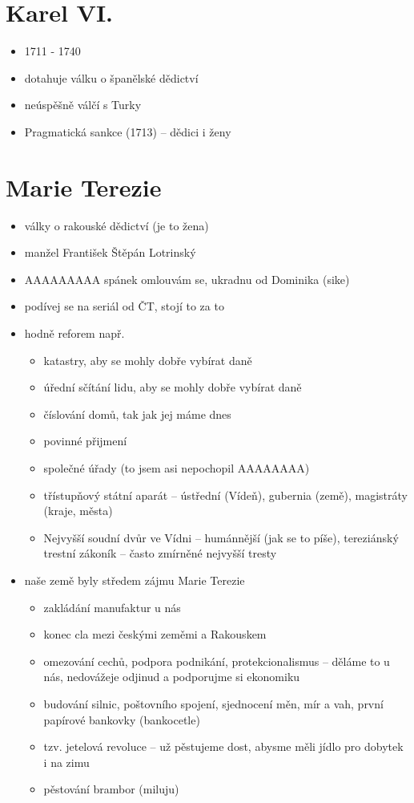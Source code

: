 \documentclass{article}
\begin{document}
\section{Karel VI.}
\begin{itemize}
  \item 1711 - 1740
  \item dotahuje válku o španělské dědictví
  \item neúspěšně válčí s Turky
  \item Pragmatická sankce (1713) -- dědici i ženy
\end{itemize}

\section{Marie Terezie}
\begin{itemize}
  \item války o rakouské dědictví (je to žena)
  \item manžel František Štěpán Lotrinský
  \item AAAAAAAAA spánek omlouvám se, ukradnu od Dominika (sike)
  \item podívej se na seriál od ČT, stojí to za to
  \item hodně reforem např.
  \begin{itemize}
    \item katastry, aby se mohly dobře vybírat daně
    \item úřední sčítání lidu, aby se mohly dobře vybírat daně
    \item číslování domů, tak jak jej máme dnes
    \item povinné přijmení
    \item společné úřady (to jsem asi nepochopil AAAAAAAA)
    \item třístupňový státní aparát -- ústřední (Vídeň), gubernia (země), magistráty (kraje, města)
    \item Nejvyšší soudní dvůr ve Vídni -- humánnější (jak se to píše), tereziánský trestní zákoník -- často zmírněné nejvyšší tresty
  \end{itemize}
  \item naše země byly středem zájmu Marie Terezie
  \begin{itemize}
    \item zakládání manufaktur u nás
    \item konec cla mezi českými zeměmi a Rakouskem
    \item omezování cechů, podpora podnikání, protekcionalismus -- děláme to u nás, nedovážeje odjinud a podporujme si ekonomiku
    \item budování silnic, poštovního spojení, sjednocení měn, mír a vah, první papírové bankovky (bankocetle)
    \item tzv. jetelová revoluce -- už pěstujeme dost, abysme měli jídlo pro dobytek i na zimu
    \item pěstování brambor (miluju)
  \end{itemize}
\end{itemize}
\end{document}
